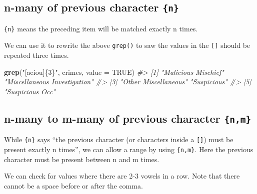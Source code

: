 \documentclass[
  12pt,
]{book}
\newenvironment{Shaded}{\begin{snugshade}}{\end{snugshade}}
\newcommand{\CommentTok}[1]{\textcolor[rgb]{0.56,0.35,0.01}{\textit{#1}}}
\newcommand{\DataTypeTok}[1]{\textcolor[rgb]{0.13,0.29,0.53}{#1}}
\newcommand{\KeywordTok}[1]{\textcolor[rgb]{0.13,0.29,0.53}{\textbf{#1}}}
\newcommand{\NormalTok}[1]{#1}
\newcommand{\OtherTok}[1]{\textcolor[rgb]{0.56,0.35,0.01}{#1}}
\newcommand{\StringTok}[1]{\textcolor[rgb]{0.31,0.60,0.02}{#1}}
\begin{document}
\hypertarget{n-many-of-previous-character-n}{%
\subsection{\texorpdfstring{n-many of previous character \texttt{\{n\}}}{n-many of previous character \{n\}}}\label{n-many-of-previous-character-n}}

\texttt{\{n\}} means the preceding item will be matched exactly n times.

We can use it to rewrite the above \texttt{grep()} to saw the values in the \texttt{{[}{]}} should be repeated three times.

\begin{Shaded}
\begin{Highlighting}[]
\KeywordTok{grep}\NormalTok{(}\StringTok{"[aeiou]\{3\}"}\NormalTok{, crimes, }\DataTypeTok{value =} \OtherTok{TRUE}\NormalTok{)}
\CommentTok{\#> [1] "Malicious Mischief"          "Miscellaneous Investigation"}
\CommentTok{\#> [3] "Other Miscellaneous"         "Suspicious"                 }
\CommentTok{\#> [5] "Suspicious Occ"}
\end{Highlighting}
\end{Shaded}

\hypertarget{n-many-to-m-many-of-previous-character-nm}{%
\subsection{\texorpdfstring{n-many to m-many of previous character \texttt{\{n,m\}}}{n-many to m-many of previous character \{n,m\}}}\label{n-many-to-m-many-of-previous-character-nm}}

While \texttt{\{n\}} says ``the previous character (or characters inside a \texttt{{[}{]}}) must be present exactly n times'', we can allow a range by using \texttt{\{n,m\}}. Here the previous character must be present between n and m times.

We can check for values where there are 2-3 vowels in a row. Note that there cannot be a space before or after the comma.
\end{document}
